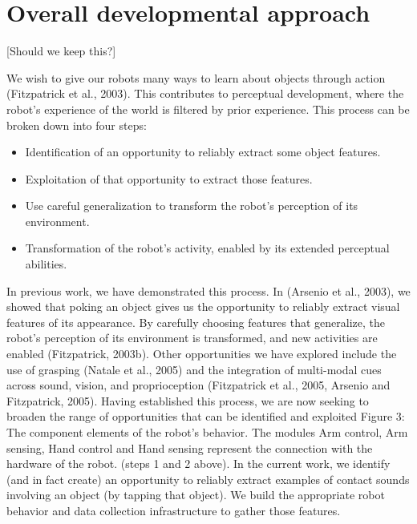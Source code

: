 \section{Overall developmental approach}
 \label{sec:approach}
[Should we keep this?]

 We wish to give our robots many ways to learn about
objects through action (Fitzpatrick et al., 2003). This
contributes to perceptual development, where the robot's
experience of the world is filtered by prior experience. This
process can be broken down into four steps:

\begin{itemize}

\item Identification of an opportunity to reliably extract some
object features.

\item Exploitation of that opportunity to extract those features.

\item Use careful generalization to transform the robot's
perception of its environment.

\item Transformation of the robot's activity, enabled by its
extended perceptual abilities.

\end{itemize}

In previous work, we have demonstrated this process. In (Arsenio
et al., 2003), we showed that poking an object gives us the
opportunity to reliably extract visual features of its appearance.
By carefully choosing features that generalize, the robot's
perception of its environment is transformed, and new activities
are enabled (Fitzpatrick, 2003b). Other opportunities we have
explored include the use of grasping (Natale et al., 2005) and the
integration of multi-modal cues across sound, vision, and
proprioception (Fitzpatrick et al., 2005, Arsenio and Fitzpatrick,
2005). Having established this process, we are now seeking to
broaden the range of opportunities that can be identified and
exploited Figure 3: The component elements of the robot's
behavior. The modules Arm control, Arm sensing, Hand control and
Hand sensing represent the connection with the hardware of the
robot. (steps 1 and 2 above). In the current work, we identify
(and in fact create) an opportunity to reliably extract examples
of contact sounds involving an object (by tapping that object). We
build the appropriate robot behavior and data collection
infrastructure to gather those features.




